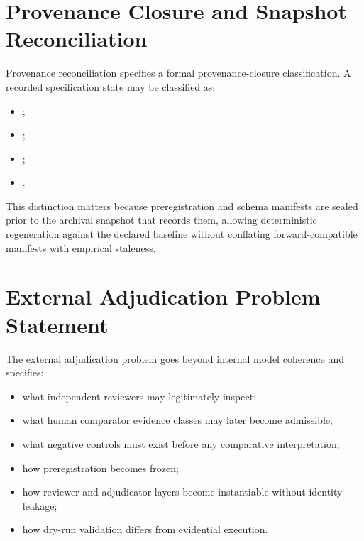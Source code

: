 \documentclass[11pt,a4paper]{article}
\begin{document}
\section{Provenance Closure and Snapshot Reconciliation}

Provenance reconciliation specifies a formal provenance-closure classification. A recorded specification state may be classified as:

\begin{itemize}
\item \texttt{\allowbreak{}\allowbreak{}};
\item \texttt{\allowbreak{}\allowbreak{}\allowbreak{}};
\item \texttt{\allowbreak{}\allowbreak{}\allowbreak{}};
\item \texttt{\allowbreak{}\allowbreak{}\allowbreak{}\allowbreak{}\allowbreak{}\allowbreak{}\allowbreak{}}.
\end{itemize}

This distinction matters because preregistration and schema manifests are sealed prior to the archival snapshot that records them, allowing deterministic regeneration against the declared baseline without conflating forward-compatible manifests with empirical staleness.

\section{External Adjudication Problem Statement}

The external adjudication problem goes beyond internal model coherence and specifies:

\begin{itemize}
\item what independent reviewers may legitimately inspect;
\item what human comparator evidence classes may later become admissible;
\item what negative controls must exist before any comparative interpretation;
\item how preregistration becomes frozen;
\item how reviewer and adjudicator layers become instantiable without identity leakage;
\item how dry-run validation differs from evidential execution.
\end{itemize}
\end{document}
